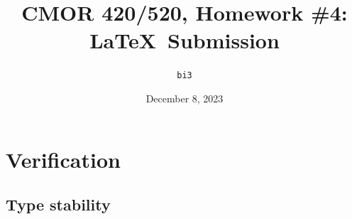 \documentclass{article}
\begin{document}
\title{CMOR 420\slash520, Homework \#4: \LaTeX\ Submission}
\author{\texttt{bi3}}
\date{December 8, 2023}
\maketitle

\section*{Verification}

\subsection*{Type stability}

\begin{verbatim}


\end{verbatim}
\end{document}
